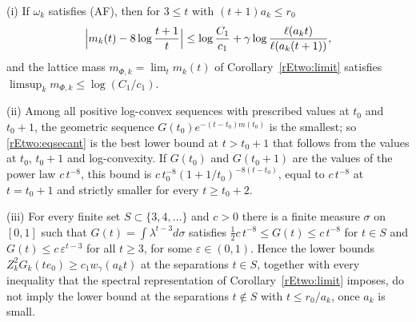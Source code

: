 \begin{proposition}\label{rEtwo:compare}
\textup{(i)} If $\omega_k$ satisfies (AF), then for $3\le t$ with $(t+1)
a_k\le r_0$
\[
\Bigl|m_k(t)-8\log\frac{t+1}t\Bigr|\le\log\frac{C_1}{c_1}+\gamma\log
\frac{\ell(a_kt)}{\ell(a_k(t+1))} ,
\]
and the lattice mass $m_{\Phi,k}=\lim_tm_k(t)$ of Corollary~\ref{rEtwo:limit}
satisfies $\limsup_km_{\Phi,k}\le\log(C_1/c_1)$.

\textup{(ii)} Among all positive log-convex sequences with prescribed
values at $t_0$ and $t_0+1$, the geometric sequence $G(t_0)e^{-(t-t_0)
m(t_0)}$ is the smallest; so \eqref{rEtwo:eqsecant} is the best lower bound
at $t>t_0+1$ that follows from the values at $t_0$, $t_0+1$ and
log-convexity. If $G(t_0)$ and $G(t_0+1)$ are the values of the power law
$c\,t^{-8}$, this bound is $c\,t_0^{-8}(1+1/t_0)^{-8(t-t_0)}$, equal to
$c\,t^{-8}$ at $t=t_0+1$ and strictly smaller for every $t\ge t_0+2$.

\textup{(iii)} For every finite set $S\subset\{3,4,\dots\}$ and $c>0$ there
is a finite measure $\sigma$ on $[0,1]$ such that $G(t)=\int\lambda^{t-3}
d\sigma$ satisfies $\tfrac12c\,t^{-8}\le G(t)\le c\,t^{-8}$ for $t\in S$ and
$G(t)\le c\,\varepsilon^{t-3}$ for all $t\ge3$, for some $\varepsilon\in(0,1)$.
Hence the lower bounds $Z_k^2G_k(te_0)\ge c_1w_\gamma(a_kt)$ at the
separations $t\in S$, together with every inequality that the spectral
representation of Corollary~\ref{rEtwo:limit} imposes, do not imply the
lower bound at the separations $t\notin S$ with $t\le r_0/a_k$, once $a_k$
is small.
\end{proposition}


